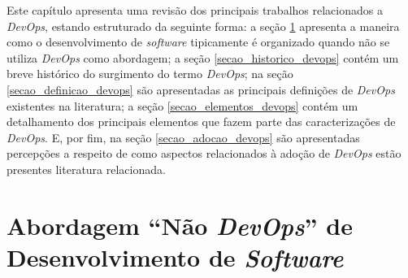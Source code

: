 \newcommand{\texCommand}[1]{\texttt{\textbackslash{#1}}}%

\newcommand{\exemplo}[1]{%
\vspace{\baselineskip}%
\noindent\fbox{\begin{minipage}{\textwidth}#1\end{minipage}}%
\\\vspace{\baselineskip}}%

\newcommand{\exemploVerbatim}[1]{%
\vspace{\baselineskip}%
\noindent\fbox{\begin{minipage}{\textwidth}%
#1\end{minipage}}%
\\\vspace{\baselineskip}}%

Este capítulo apresenta uma revisão dos principais trabalhos relacionados a
\textit{DevOps}, estando estruturado da seguinte forma: a seção \ref{secao_abordagem_nao_devops}
apresenta a maneira como o desenvolvimento de \textit{software} tipicamente é
organizado quando não se utiliza \textit{DevOps} como abordagem; a seção \ref{secao_historico_devops}
contém um breve histórico do surgimento do termo \textit{DevOps}; na seção
\ref{secao_definicao_devops} são apresentadas as principais definições de
\textit{DevOps} existentes na literatura; a seção \ref{secao_elementos_devops}
contém um detalhamento dos principais elementos que fazem parte das caracterizações
de \textit{DevOps}. E, por fim, na seção \ref{secao_adocao_devops}
são apresentadas percepções a respeito de como aspectos relacionados à adoção
de \textit{DevOps} estão presentes literatura relacionada.

\section{Abordagem ``Não \textit{DevOps}'' de Desenvolvimento de \textit{Software}}
\label{secao_abordagem_nao_devops}


